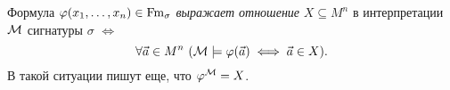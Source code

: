 \begin{definition}
    Формула $\varphi(x_{1}, \ldots, x_{n}) \in \mathrm{Fm}_{\sigma}$ {\it выражает отношение} $X \subseteq M^{n}$ в интерпретации $\mathcal{M}$ сигнатуры $\sigma$ $\iff$
    $$
        \forall \vec{a} \in M^{n}~(\mathcal{M} \models \varphi(\vec{a}) \iff \vec{a} \in X).
    $$
    В такой ситуации пишут еще, что $\varphi^{\mathcal{M}} = X$.
\end{definition}
